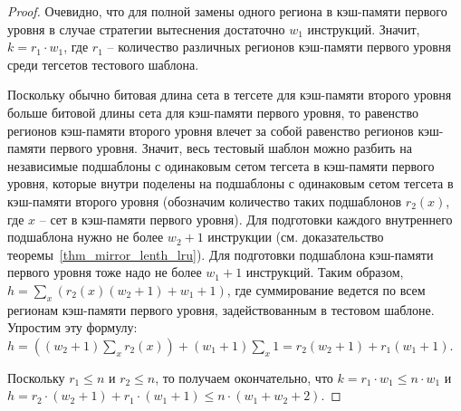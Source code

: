 \lemmatext{\ref{max_k_h}}{\MaxUpperBoundLRU}
\begin{proof}
  Очевидно, что для полной замены одного региона в кэш-памяти
  первого уровня в случае стратегии вытеснения \LRU достаточно $w_1$
  инструкций. Значит, $k = r_1 \cdot w_1$, где $r_1$ -- количество
  различных регионов кэш-памяти первого уровня среди тегсетов
  тестового шаблона.

  Поскольку обычно битовая длина сета в тегсете для кэш-памяти
  второго уровня больше битовой длины сета для кэш-памяти первого
  уровня, то равенство регионов кэш-памяти второго уровня влечет за
  собой равенство регионов кэш-памяти первого уровня. Значит, весь
  тестовый шаблон можно разбить на независимые подшаблоны с
  одинаковым сетом тегсета в кэш-памяти первого уровня, которые
  внутри поделены на подшаблоны с одинаковым сетом тегсета в
  кэш-памяти второго уровня (обозначим количество таких подшаблонов
  $r_2(x)$, где $x$ -- сет в кэш-памяти первого уровня). Для
  подготовки каждого внутреннего подшаблона нужно не более $w_2+1$
  инструкции (см. доказательство
  теоремы~\ref{thm_mirror_lenth_lru}). Для подготовки подшаблона
  кэш-памяти первого уровня тоже надо не более $w_1 + 1$ инструкций.
  Таким образом, $h = \sum\limits_x ( r_2(x)(w_2+1) + w_1 + 1)$, где
  суммирование ведется по всем регионам кэш-памяти первого уровня,
  задействованным в тестовом шаблоне. Упростим эту формулу: $h =
  ((w_2 + 1)\sum\limits_x r_2(x)) + (w_1 + 1)\sum\limits_x 1 =
  r_2(w_2 + 1) + r_1 (w_1 + 1)$.

  Поскольку $r_1 \leqslant n$ и $r_2 \leqslant n$, то получаем
  окончательно, что $k = r_1 \cdot w_1 \leqslant n \cdot w_1$ и $h =
  r_2 \cdot (w_2 + 1) + r_1 \cdot (w_1 + 1) \leqslant n \cdot (w_1 +
  w_2 + 2)$.
\end{proof}

